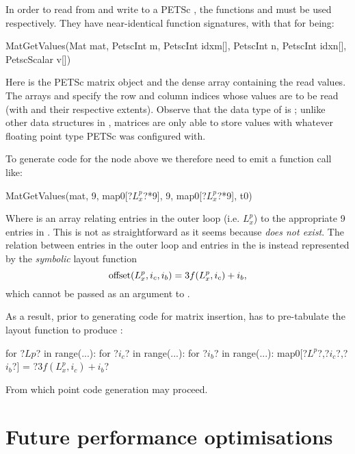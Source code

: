 \documentclass[thesis]{subfiles}
\begin{document}
In order to read from and write to a PETSc , the functions  and  must be used respectively.
They have near-identical function signatures, with that for  being:
\begin{cinline}
  MatGetValues(Mat mat,
               PetscInt m, PetscInt idxm[],
               PetscInt n, PetscInt idxn[],
               PetscScalar v[])
\end{cinline}
Here  is the PETSc matrix object and  the dense array containing the read values.
The arrays  and  specify the row and column indices whose values are to be read (with  and  their respective extents).
Observe that the data type of  is ; unlike other data structures in , matrices are only able to store values with whatever floating point type PETSc was configured with.

To generate code for the  node above we therefore need to emit a function call like:
\begin{cinline}
  MatGetValues(mat, 9, map0[?$L^p_x$?*9], 9, map0[?$L^p_x$?*9], t0)
\end{cinline}
Where  is an array relating entries in the outer loop (i.e. $L^p_x$) to the appropriate 9 entries in .
This is not as straightforward as it seems because  \emph{does not exist}.
The relation between entries in the outer loop and entries in the  is instead represented by the \emph{symbolic} layout function
\begin{equation*}
  \textnormal{offset}(L^p_x,i_c,i_b) = 3 f(L^p_x,i_c) + i_b,
\end{equation*}
which cannot be passed as an argument to .

As a result, prior to generating code for matrix insertion,  has to pre-tabulate the layout function to produce :
\begin{pyinline}
  for ?$Lp$? in range(...):
    for ?$i_c$? in range(...):
      for ?$i_b$? in range(...):
        map0[?$L^p$?,?$i_c$?,?$i_b$?] = ?$3 f(L^p_x,i_c) + i_b$?
\end{pyinline}
From which point code generation may proceed.

\section{Future performance optimisations}
\label{sec:codegen_optimisation}
\end{document}
